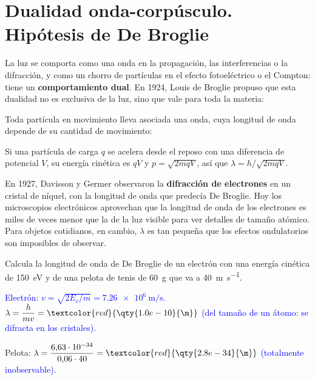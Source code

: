 \section{Dualidad onda-corpúsculo. Hipótesis de De Broglie}\label{sec:cua-debroglie}

La luz se comporta como una onda en la propagación, las interferencias o la difracción, y como un chorro de partículas en el efecto
fotoeléctrico o el Compton: tiene un \textbf{comportamiento dual}. En 1924, Louis de Broglie propuso que esta dualidad no es exclusiva
de la luz, sino que vale para toda la materia:

\begin{definition}
    Toda partícula en movimiento lleva asociada una onda, cuya longitud de onda depende de su cantidad de movimiento:
    \begin{centeredequation}
         \label{eq:cua-debroglie}
    \end{centeredequation}
\end{definition}

Si una partícula de carga \(q\) se acelera desde el reposo con una diferencia de potencial \(V\), su energía cinética es \(qV\) y
\(p = \sqrt{2mqV}\), así que \(\lambda = h/\sqrt{2mqV}\).

En 1927, Davisson y Germer observaron la \textbf{difracción de electrones} en un cristal de níquel, con la longitud de onda que predecía
De Broglie. Hoy los microscopios electrónicos aprovechan que la longitud de onda de los electrones es miles de veces menor que la de la
luz visible para ver detalles de tamaño atómico. Para objetos cotidianos, en cambio, \(\lambda\) es tan pequeña que los efectos
ondulatorios son imposibles de observar.

\begin{exercise}
    Calcula la longitud de onda de De Broglie de un electrón con una energía cinética de \qty{150}{\electronvolt} y de una pelota de tenis de
    \qty{60}{\g} que va a \qty{40}{\m\per\second}.
    \begin{solu}
        \textcolor{blue}{Electrón: \(v = \sqrt{2E_c/m} = \qty{7.26e6}{\m\per\second}\).} \(\lambda = \dfrac{h}{mv} = \textcolor{red}{\qty{1.0e-10}{\m}}\)
        \textcolor{blue}{(del tamaño de un átomo: se difracta en los cristales).}

        Pelota: \(\lambda = \dfrac{6{,}63\cdot 10^{-34}}{0{,}06\cdot 40} = \textcolor{red}{\qty{2.8e-34}{\m}}\) \textcolor{blue}{(totalmente inobservable).}
    \end{solu}
\end{exercise}

